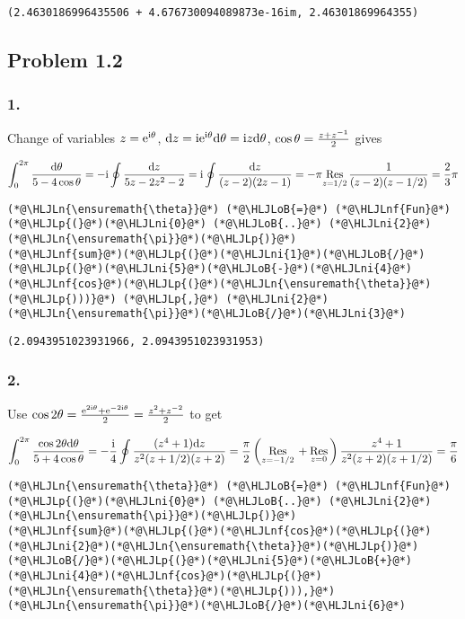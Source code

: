 \documentclass[12pt,a4paper]{article}
\newcommand{\HLJLn}[1]{#1}
\newcommand{\HLJLnf}[1]{\textcolor[RGB]{66,102,213}{#1}}
\newcommand{\HLJLni}[1]{\textcolor[RGB]{59,151,46}{#1}}
\newcommand{\HLJLoB}[1]{\textcolor[RGB]{102,102,102}{\textbf{#1}}}
\newcommand{\HLJLp}[1]{#1}
\def\D{ {\rm d} }
\def\I{ {\rm i} }
\def\E{ {\rm e} }
\def\Res_#1{\underset{#1}{\rm Res}\,}
\def\dz{\D z}
\begin{document}
\begin{lstlisting}
(2.4630186996435506 + 4.676730094089873e-16im, 2.46301869964355)
\end{lstlisting}


\subsection{Problem 1.2}
\subsubsection{1.}
Change of variables $z = \E^{\I \theta}$, $\dz = \I \E^{\I \theta} \D\theta = \I z \D\theta$, $\cos \theta = {z + z^{-1} \over 2}$ gives

\[
\int_0^{2 \pi} {\D\theta \over 5-4 \cos \theta}  = - \I \oint {\dz \over 5z - 2z^2 - 2}  = \I \oint {\dz \over (z-2)(2z-1)} = -\pi \Res_{z=1/2} {1 \over (z-2)(z-1/2)} = {2 \over 3} \pi
\]

\begin{lstlisting}
(*@\HLJLn{\ensuremath{\theta}}@*) (*@\HLJLoB{=}@*) (*@\HLJLnf{Fun}@*)(*@\HLJLp{(}@*)(*@\HLJLni{0}@*) (*@\HLJLoB{..}@*) (*@\HLJLni{2}@*)(*@\HLJLn{\ensuremath{\pi}}@*)(*@\HLJLp{)}@*)
(*@\HLJLnf{sum}@*)(*@\HLJLp{(}@*)(*@\HLJLni{1}@*)(*@\HLJLoB{/}@*)(*@\HLJLp{(}@*)(*@\HLJLni{5}@*)(*@\HLJLoB{-}@*)(*@\HLJLni{4}@*)(*@\HLJLnf{cos}@*)(*@\HLJLp{(}@*)(*@\HLJLn{\ensuremath{\theta}}@*)(*@\HLJLp{)))}@*) (*@\HLJLp{,}@*) (*@\HLJLni{2}@*)(*@\HLJLn{\ensuremath{\pi}}@*)(*@\HLJLoB{/}@*)(*@\HLJLni{3}@*)
\end{lstlisting}

\begin{lstlisting}
(2.0943951023931966, 2.0943951023931953)
\end{lstlisting}


\subsubsection{2.}
Use $\cos 2 \theta = { \E^{2 \I \theta} + \E^{-2 \I \theta} \over 2} = {z^2 + z^{-2} \over 2}$ to get

\[
\int_0^{2 \pi} {\cos 2 \theta \D\theta \over 5+4 \cos \theta}  = - {\I \over 4} \oint { (z^4 + 1)\dz \over z^2 (z+1/2)(z+2)}  = {\pi \over 2} \left( \Res_{z=-1/2} + \Res_{z=0}\right) {z^4+1 \over z^2(z+2)(z+1/2)} = {\pi \over 6}
\]

\begin{lstlisting}
(*@\HLJLn{\ensuremath{\theta}}@*) (*@\HLJLoB{=}@*) (*@\HLJLnf{Fun}@*)(*@\HLJLp{(}@*)(*@\HLJLni{0}@*) (*@\HLJLoB{..}@*) (*@\HLJLni{2}@*)(*@\HLJLn{\ensuremath{\pi}}@*)(*@\HLJLp{)}@*)
(*@\HLJLnf{sum}@*)(*@\HLJLp{(}@*)(*@\HLJLnf{cos}@*)(*@\HLJLp{(}@*)(*@\HLJLni{2}@*)(*@\HLJLn{\ensuremath{\theta}}@*)(*@\HLJLp{)}@*)(*@\HLJLoB{/}@*)(*@\HLJLp{(}@*)(*@\HLJLni{5}@*)(*@\HLJLoB{+}@*)(*@\HLJLni{4}@*)(*@\HLJLnf{cos}@*)(*@\HLJLp{(}@*)(*@\HLJLn{\ensuremath{\theta}}@*)(*@\HLJLp{))),}@*) (*@\HLJLn{\ensuremath{\pi}}@*)(*@\HLJLoB{/}@*)(*@\HLJLni{6}@*)
\end{lstlisting}
\end{document}
